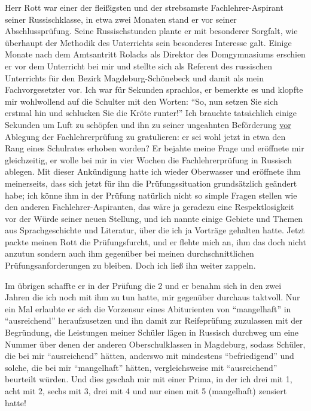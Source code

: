 Herr Rott war einer der fleißigsten und der strebsamste Fachlehrer-Aspirant seiner Russischklasse,  in etwa zwei Monaten stand er vor seiner Abschlussprüfung. Seine Russischstunden plante er mit besonderer Sorgfalt, wie überhaupt der Methodik des Unterrichts sein besonderes Interesse galt. Einige Monate nach dem Amtsantritt Rolacks als Direktor des Domgymnasiums erschien er vor dem Unterricht bei mir und stellte sich als Referent des russischen Unterrichts für den Bezirk Magdeburg-Schönebeck und damit als mein Fachvorgesetzter vor. Ich war für Sekunden sprachlos, er bemerkte es und klopfte mir wohlwollend auf die Schulter mit den Worten: \enquote{So, nun setzen Sie sich erstmal hin und schlucken Sie die Kröte runter!} Ich brauchte tatsächlich einige Sekunden um Luft zu schöpfen und ihn zu seiner ungeahnten Beförderung \underline{vor} Ablegung der Fachlehrerprüfung zu gratulieren: er sei wohl jetzt in etwa den Rang eines Schulrates erhoben worden? Er bejahte meine Frage und eröffnete mir gleichzeitig, er wolle bei mir in vier Wochen die Fachlehrerprüfung in Russisch ablegen. Mit dieser Ankündigung hatte ich wieder Oberwasser und eröffnete ihm meinerseits, dass sich jetzt für ihn die Prüfungssituation grundsätzlich geändert habe; ich könne ihm in der Prüfung  natürlich nicht so simple Fragen stellen wie den anderen Fachlehrer-Aspiranten, das wäre ja geradezu eine Respektlosigkeit vor der Würde seiner neuen Stellung, und ich nannte einige Gebiete und Themen aus Sprachgeschichte und Literatur, über die ich ja Vorträge gehalten hatte. Jetzt packte meinen Rott die Prüfungsfurcht, und er flehte mich an, ihm das doch nicht anzutun sondern auch ihm gegenüber bei meinen durchschnittlichen Prüfungsanforderungen zu bleiben. Doch ich ließ ihn weiter zappeln.

Im übrigen schaffte er in der Prüfung die 2 und er benahm sich in den zwei Jahren die ich noch mit ihm zu tun hatte, mir gegenüber durchaus taktvoll. Nur ein Mal erlaubte er sich die Vorzensur eines Abiturienten von \enquote{mangelhaft} in \enquote{ausreichend} heraufzusetzen und ihn damit zur Reifeprüfung zuzulassen mit der Begründung, die Leistungen meiner Schüler lägen in Russisch durchweg um eine Nummer über denen der anderen Oberschulklassen in Magdeburg, sodass Schüler, die bei mir \enquote{ausreichend} hätten, anderswo mit mindestens \enquote{befriedigend} und solche, die bei mir \enquote{mangelhaft} hätten, vergleichsweise mit \enquote{ausreichend} beurteilt würden. Und dies geschah mir mit einer Prima, in der ich drei  mit 1, acht mit 2, sechs mit 3, drei mit 4 und nur einen mit 5 (mangelhaft) zensiert hatte!

